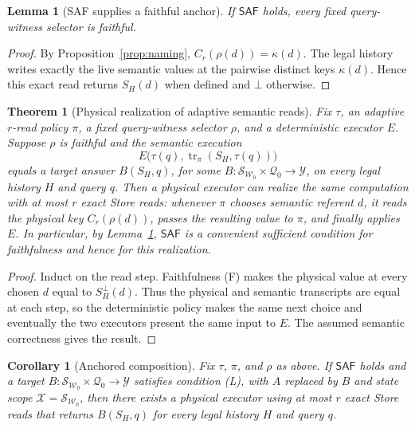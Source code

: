 \documentclass[11pt]{article}
\theoremstyle{definition}
\theoremstyle{plain}
\newtheorem{lemma}{Lemma}
\newtheorem{theorem}{Theorem}
\newtheorem{corollary}{Corollary}
\newcommand{\Wr}{\mathcal{W}}
\newcommand{\Qu}{\mathcal{Q}}
\newcommand{\bt}{\bot}
\newcommand{\SAF}{\mathsf{SAF}}
\begin{document}
\begin{lemma}[SAF supplies a faithful anchor]\label{lem:anchor}
If \(\SAF\) holds, every fixed query-witness selector is faithful.
\end{lemma}

\begin{proof}
By Proposition~\ref{prop:naming}, \(C_r(\rho(d))=\kappa(d)\).  The legal
history writes exactly the live semantic values at the pairwise distinct keys
\(\kappa(d)\).  Hence this exact read returns \(S_H(d)\) when defined and
\(\bt\) otherwise.
\end{proof}

\begin{theorem}[Physical realization of adaptive semantic reads]
  \label{thm:bridge}
Fix \(\tau\), an adaptive \(r\)-read policy \(\pi\), a fixed
query-witness selector \(\rho\), and a deterministic executor \(E\).
Suppose \(\rho\) is faithful and the semantic execution
\[
 E\bigl(\tau(q),\operatorname{tr}_{\pi}(S_H,\tau(q))\bigr)
\]
equals a target answer \(B(S_H,q)\), for some
\(B:\mathcal S_{\Wr_0}\times\Qu_0\to\mathcal Y\), on every legal history
\(H\) and query \(q\).  Then a physical executor can realize the same
computation with at most \(r\) exact Store reads: whenever \(\pi\) chooses
semantic referent \(d\), it reads the physical key \(C_r(\rho(d))\), passes
the resulting value to \(\pi\), and finally applies \(E\).  In particular,
by Lemma~\ref{lem:anchor}, \(\SAF\) is a convenient sufficient condition for
faithfulness and hence for this realization.
\end{theorem}

\begin{proof}
Induct on the read step.  Faithfulness (F) makes the physical value at every
chosen \(d\) equal to \(S_H^{\bt}(d)\).  Thus the physical and semantic
transcripts are equal at each step, so the deterministic policy makes the
same next choice and eventually the two executors present the same input to
\(E\).  The assumed semantic correctness gives the result.
\end{proof}

\begin{corollary}[Anchored composition]\label{cor:composition}
Fix \(\tau\), \(\pi\), and \(\rho\) as above.  If \(\SAF\) holds and a
target \(B:\mathcal S_{\Wr_0}\times\Qu_0\to\mathcal Y\) satisfies condition
(L), with \(A\) replaced by \(B\) and state scope
\(\mathcal X=\mathcal S_{\Wr_0}\), then there exists a physical executor
using at most \(r\) exact Store reads that returns \(B(S_H,q)\) for every
legal history \(H\) and query \(q\).
\end{corollary}
\end{document}
